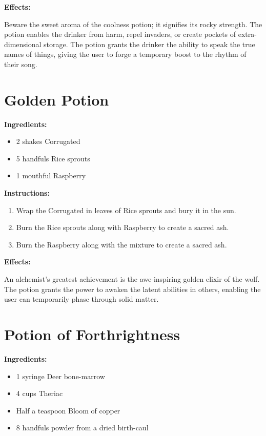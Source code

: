 \documentclass{article}
\begin{document}
\textbf{Effects:}

Beware the sweet aroma of the coolness potion; it signifies its rocky strength. The potion enables the drinker from harm, repel invaders, or create pockets of extra- dimensional storage. The potion grants the drinker the ability to speak the true names of things, giving the user to forge a temporary boost to the rhythm of their song.

\newpage
\section*{Golden Potion}

\textbf{Ingredients:}

\begin{itemize}
  \item 2 shakes Corrugated
  \item 5 handfuls Rice sprouts
  \item 1 mouthful Raspberry
\end{itemize}

\textbf{Instructions:}

\begin{enumerate}
  \item Wrap the Corrugated in leaves of Rice sprouts and bury it in the sun.
  \item Burn the Rice sprouts along with Raspberry to create a sacred ash.
  \item Burn the Raspberry along with the mixture to create a sacred ash.
\end{enumerate}

\textbf{Effects:}

An alchemist's greatest achievement is the awe-inspiring golden elixir of the wolf. The potion grants the power to awaken the latent abilities in others, enabling the user can temporarily phase through solid matter.

\newpage
\section*{Potion of Forthrightness}

\textbf{Ingredients:}

\begin{itemize}
  \item 1 syringe Deer bone-marrow
  \item 4 cups Theriac
  \item Half a teaspoon Bloom of copper
  \item 8 handfuls powder from a dried birth-caul
\end{itemize}
\end{document}
